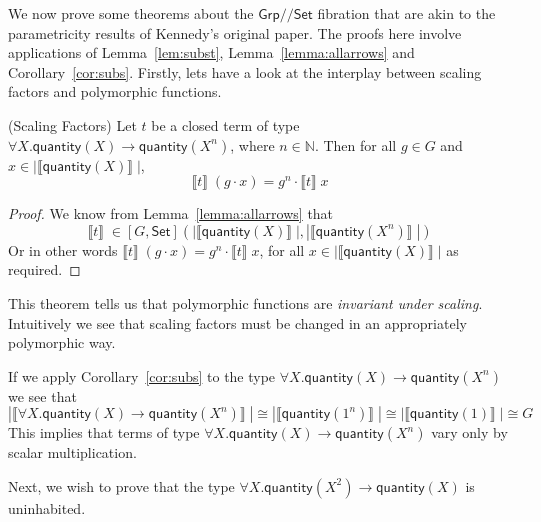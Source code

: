\documentclass[a4paper,UKenglish]{lipics}
\newcommand{\msf}[1]{\mathsf{#1}} %
\newcommand{\Grp}{\msf{Grp}}
\newcommand{\Set}{\msf{Set}}
\newcommand{\GroupSet}[1]{[#1,\Set]}
\newcommand{\Lslice}[1]{#1/\!/\Set}
\newcommand{\GrpSet}{\Lslice{\Grp}}
\newcommand{\GSet}{\GroupSet{G}}
\newcommand{\sem}[1]{\ensuremath{\llbracket #1 \rrbracket} \;}
\newcommand{\qnt}{\msf{quantity}}
\begin{document}
We now prove some theorems about the $\GrpSet$ fibration that are akin to the parametricity results of Kennedy's original paper. The proofs here involve applications of Lemma~\ref{lem:subst}, Lemma~\ref{lemma:allarrows} and Corollary~\ref{cor:subs}. Firstly, lets have a look at the interplay between scaling factors and polymorphic functions.

\begin{theorem}(Scaling Factors)
\label{thm:ScalFact}
Let $t$ be a closed term of type $\forall X. \qnt(X) \rightarrow \qnt(X^n)$, where $n\in \mathbb{N}$. Then for all $g \in G$ and $x \in |\sem{\qnt(X)}|$,
\[
\sem{t} (g \cdot x) = g^n \cdot \sem{t} x
\]
\end{theorem}
\begin{proof}
We know from Lemma~\ref{lemma:allarrows} that
\[
\sem{t} \in \GSet(|\sem{\qnt(X)}|,|\sem{\qnt(X^n)}|)
\]
Or in other words $\sem{t} (g \cdot x) = g^n \cdot \sem{t} x$, for all $x \in |\sem{\qnt(X)}|$ as required.
\end{proof}
This theorem tells us that polymorphic functions are \emph{invariant under scaling}. Intuitively we see that scaling factors must be changed in an appropriately polymorphic way.

If we apply Corollary~\ref{cor:subs} to the type $\forall X. \qnt(X)\rightarrow \qnt(X^n)$ we see that
\[
 |\sem{\forall X. \qnt(X)\rightarrow \qnt(X^n)}| \cong |\sem{\qnt(1^n)}| \cong |\sem{\qnt(1)}| \cong G
\]
This implies that terms of type $\forall X. \qnt(X)\rightarrow \qnt(X^n)$ vary only by scalar multiplication.


Next, we wish to prove that the type  $\forall X . \qnt(X^2) \rightarrow \qnt(X)$ is uninhabited.
\end{document}
